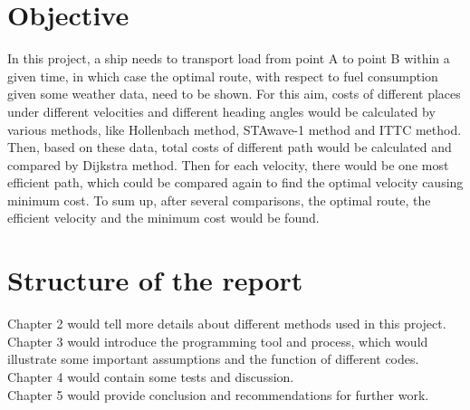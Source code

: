 \section{Objective}
In this project, a ship needs to transport load from point A to point B within a given time, in which case the optimal route, with respect to fuel consumption given some weather data, need to be shown. For this aim, costs of different places under different velocities and different heading angles would be calculated by various methods, like Hollenbach method, STAwave-1 method and ITTC method. Then, based on these data, total costs of different path would be calculated and compared by Dijkstra method. Then for each velocity, there would be one most efficient path, which could be compared again to find the optimal velocity causing minimum cost. To sum up, after several comparisons, the optimal route, the efficient velocity and the minimum cost would be found.

\section{Structure of the report}
Chapter 2 would tell more details about different methods used in this project.
\\Chapter 3 would introduce the programming tool and process, which would illustrate some important assumptions and the function of different codes.
\\Chapter 4 would contain some tests and discussion.
\\Chapter 5 would provide conclusion and recommendations for further work.